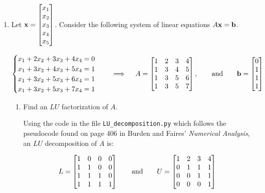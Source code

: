 \documentclass[11pt,oneside,english,reqno]{amsart}
\theoremstyle{definition}
\newcommand{\aspace}{\hspace{7mm}\text{and}\hspace{7mm}}
\newcommand{\1}{\mathbbm{1}}
\begin{document}
\rightline{\today}




\begin{enumerate}[leftmargin=*]
\itemsep5mm



\item Let ${\bf x}=\begin{bmatrix}x_1\\x_2\\x_3\\x_4\\x_5\end{bmatrix}$. Consider the following system of linear equations $A{\bf x}={\bf b}$.

\begin{equation}
\begin{cases}x_1 +2x_2+3x_3+4x_4=0 \\ x_1+3x_2+4x_3+5x_4=1 \\ x_1+3x_2+5x_3+6x_4=1 \\ x_1+3x_2+5x_3+7x_4=1\end{cases}\quad\implies\quad A=\begin{bmatrix}1 & 2 & 3 & 4  \\ 1 & 3 & 4 & 5   \\ 1 & 3 & 5 & 6   \\ 1 & 3 & 5 & 7 \end{bmatrix}, \aspace {\bf b}=\begin{bmatrix}0 \\ 1 \\ 1 \\ 1\end{bmatrix}
\end{equation}

\begin{enumerate}
\itemsep5mm
\item Find an $LU$ factorization of $A$.

Using the code in the file \verb!LU_decomposition.py! which follows the pseudocode found on page 406 in Burden and Faires' \textit{Numerical Analysis}, an $LU$ decomposition of $A$ is:

\begin{equation}
L=\begin{bmatrix*}[r]1 & 0 & 0 & 0 \\ 1 & 1 & 0 & 0 \\ 1 & 1 & 1 & 0 \\ 1 & 1 & 1 & 1\end{bmatrix*} \aspace U=\begin{bmatrix}1 & 2 & 3 & 4 \\ 0 & 1 & 1 & 1 \\ 0 & 0 & 1 & 1 \\ 0 & 0 & 0 & 1\end{bmatrix}
\end{equation}


\end{enumerate}
\end{enumerate}
\end{document}
